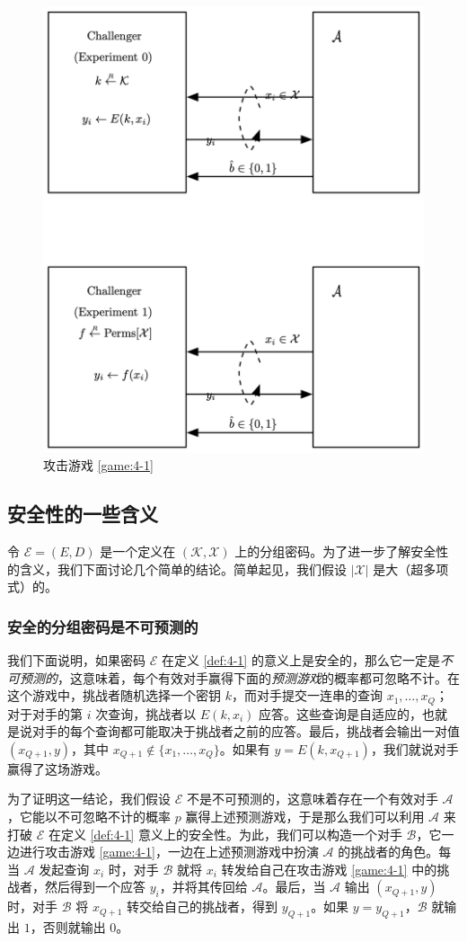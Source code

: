 \begin{figure}[p!]
  \centering
  \includegraphics[width=0.7\linewidth]{figures/chapter4/fig2.png}
  \caption{攻击游戏 \ref{game:4-1}}
  \label{fig:4-2}
\end{figure}

\subsection{安全性的一些含义}

令 $\mathcal{E}=(E,D)$ 是一个定义在 $(\mathcal{K},\mathcal{X})$ 上的分组密码。为了进一步了解安全性的含义，我们下面讨论几个简单的结论。简单起见，我们假设 $|\mathcal{X}|$ 是大（超多项式）的。

\subsubsection{安全的分组密码是不可预测的}

我们下面说明，如果密码 $\mathcal{E}$ 在定义 \ref{def:4-1} 的意义上是安全的，那么它一定是\emph{不可预测的}，这意味着，每个有效对手赢得下面的\emph{预测游戏}的概率都可忽略不计。在这个游戏中，挑战者随机选择一个密钥 $k$，而对手提交一连串的查询 $x_1,\dots,x_Q$；对于对手的第 $i$ 次查询，挑战者以 $E(k,x_i)$ 应答。这些查询是自适应的，也就是说对手的每个查询都可能取决于挑战者之前的应答。最后，挑战者会输出一对值 $(x_{Q+1},y)$，其中 $x_{Q+1}\notin\{x_1,\dots,x_Q\}$。如果有 $y=E(k,x_{Q+1})$，我们就说对手赢得了这场游戏。

为了证明这一结论，我们假设 $\mathcal{E}$ 不是不可预测的，这意味着存在一个有效对手 $\mathcal{A}$，它能以不可忽略不计的概率 $p$ 赢得上述预测游戏，于是那么我们可以利用 $\mathcal{A}$ 来打破 $\mathcal{E}$ 在定义 \ref{def:4-1} 意义上的安全性。为此，我们可以构造一个对手 $\mathcal{B}$，它一边进行攻击游戏 \ref{game:4-1}，一边在上述预测游戏中扮演 $\mathcal{A}$ 的挑战者的角色。每当 $\mathcal{A}$ 发起查询 $x_i$ 时，对手 $\mathcal{B}$ 就将 $x_i$ 转发给自己在攻击游戏 \ref{game:4-1} 中的挑战者，然后得到一个应答 $y_i$，并将其传回给 $\mathcal{A}$。最后，当 $\mathcal{A}$ 输出 $(x_{Q+1},y)$ 时，对手 $\mathcal{B}$ 将 $x_{Q+1}$ 转交给自己的挑战者，得到 $y_{Q+1}$。如果 $y=y_{Q+1}$，$\mathcal{B}$ 就输出 $1$，否则就输出 $0$。

